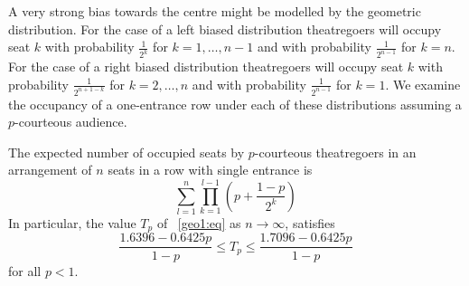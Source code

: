 \documentclass[11pt]{llncs}
\begin{document}
A very strong bias towards the centre might be modelled by the geometric distribution. 
For the case of a left biased distribution theatregoers will occupy seat $k$ with probability $\frac{1}{2^k}$
for $k=1, \ldots, n-1$ and with probability $\frac{1}{2^{n-1}}$ for $k=n$. 
For the case of a right biased distribution theatregoers will occupy seat
$k$ with probability $\frac{1}{2^{n+1-k}}$ for $k= 2, \ldots, n$ and with probability $\frac{1}{2^{n-1}}$ for $k=1$.
We examine the occupancy of a one-entrance row under each of these distributions assuming 
a $p$-courteous audience. 





\begin{theorem}
\label{thm1geol}
The expected number of occupied seats by $p$-courteous 
theatregoers in an arrangement of $n$ seats
in a row with single entrance is 
\begin{equation}
\label{geo1:eq}
\sum_{l=1}^n \prod_{k=1}^{l-1} \left( p + \frac{1-p}{2^{k}} \right) 
\end{equation}
In particular, the value $T_p$ of ~\eqref{geo1:eq} as $n\rightarrow \infty$, satisfies 
$$
\frac{1.6396 -0.6425 p}{1-p}
\leq T_p \leq 
\frac{1.7096 -0.6425 p}{1-p}
$$
for all $p<1$.
\end{theorem}
\end{document}

